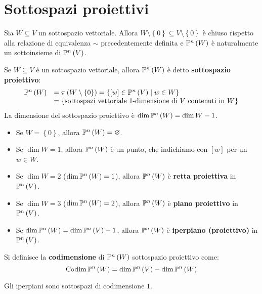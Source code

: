 \section{Sottospazi proiettivi}
Sia $W\subseteq V$ un sottospazio vettoriale. Allora $W\setminus\left\{0\right\}\subseteq V\setminus\left\{0\right\}$ è chiuso rispetto alla relazione di equivalenza $\sim$ precedentemente definita e $\proj{W}$ è naturalmente un sottoinsieme di $\proj{V}$.
\begin{define}
	Se $W\subseteq V$ è un sottospazio vettoriale, allora $\proj{W}$ è detto \textbf{sottospazio proiettivo}:
	\begin{equation*}
		\begin{array}{rl}
			\proj{W}&=\pi\left(W\setminus\left\{0\right\}\right)=\left\{\left[w\right]\in\proj{V}\mid w\in W\right\}\\
			&=\left\{\text{sottospazi vettoriale }1\text{-dimensione di }V\text{ contenuti in }W\right\}
		\end{array}
	\end{equation*}
La dimensione del sottospazio proiettivo è $\dim\proj{W}=\dim W-1$.
\end{define}
	\begin{itemize}
	\item Se $W=\left\{0\right\}$, allora $\proj{W}=\emptyset$.
	\item Se $\dim W=1$, allora $\proj{W}$ è un punto, che indichiamo con $\left[w\right]$ per un $w\in W$.
	\item Se $\dim W=2$ ($\dim\proj{W}=1$), allora $\proj{W}$ è \textbf{retta proiettiva} in $\proj{V}$.
	\item Se $\dim W=3$ ($\dim\proj{W}=2$), allora $\proj{W}$ è \textbf{piano proiettivo} in $\proj{V}$.
	\item Se $\dim\proj{W}=\dim \proj{V}-1$, allora $\proj{W}$ è \textbf{iperpiano (proiettivo)} in $\proj{V}$.
\end{itemize}
\begin{define}
Si definisce la \textbf{codimensione} di $\proj{W}$ sottospazio proiettivo come:
\begin{equation}
	\codim\proj{W}=\dim\proj{V}-\dim\proj{W}
\end{equation}
\end{define}
\begin{example}
	Gli iperpiani sono sottospazi di codimensione $1$.
\end{example}
